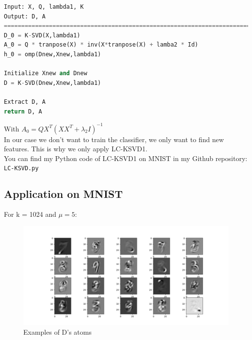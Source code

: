 \documentclass[a4paper,10pt]{article}
\begin{document}
\vspace{0.5cm}
\begin{lstlisting}[language=Python,frame=single]
Input: X, Q, lambda1, K
Output: D, A
===========================================================================
D_0 = K-SVD(X,lambda1)
A_0 = Q * tranpose(X) * inv(X*tranpose(X) + lamba2 * Id)
h_0 = omp(Dnew,Xnew,lambda1)

Initialize Xnew and Dnew
D = K-SVD(Dnew,Xnew,lambda1)

Extract D, A
return D, A
\end{lstlisting}
\vspace{0.5cm}
With $A_0 = Q X^T (XX^T + \lambda_2 I)^{-1}$
\vspace{0.5cm}\\
In our case we don't want to train the classifier, we only want to find new features. This is why we only apply LC-KSVD1.\\
You can find my Python code of  LC-KSVD1 on MNIST in my Github repository: \texttt{LC-KSVD.py}
\newpage

\subsection{Application on MNIST}
For k = 1024 and $\mu = 5$:

\begin{figure}[h]
 \centering
 \includegraphics[scale=0.5]{Results/LC-KSVD_X_ALL_K_1024/D.png}
 \caption{Examples of D's atoms}
\end{figure}
\end{document}
